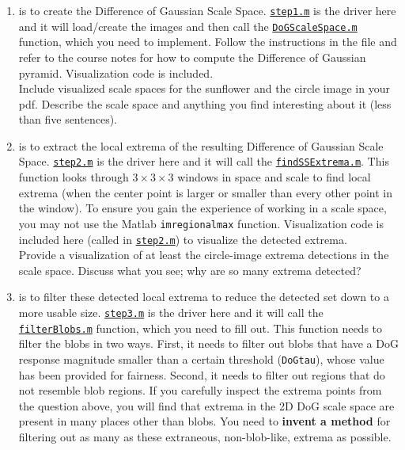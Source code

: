 \begin{enumerate}[Step 1]
\item is to create the Difference of Gaussian Scale Space.
		\href{./hw3/problem1/step1.m}{\texttt{step1.m}} is the driver here and it will load/create the images and then call the \href{./hw3/problem1/DoGScaleSpace.m}{\texttt{DoGScaleSpace.m}} function, which you need to implement.
		Follow the instructions in the file and refer to the course notes for how to compute the Difference of Gaussian pyramid.
		Visualization code is included.\\
		Include visualized scale spaces for the sunflower and the circle image in your pdf.
		Describe the scale space and anything you find interesting about it (less than five sentences).
\item is to extract the local extrema of the resulting Difference of Gaussian Scale Space.
		\href{./hw3/problem1/step2.m}{\texttt{step2.m}} is the driver here and it will call the \href{./hw3/problem1/findSSExtrema.m}{\texttt{findSSExtrema.m}}.
		This function looks through \(3 \times 3 \times 3\) windows in space and scale to find local extrema (when the center point is larger or smaller than every other point in the window).
		To ensure you gain the experience of working in a scale space, you may not use the Matlab \texttt{imregionalmax} function.
		Visualization code is included here (called in \href{./hw3/problem1/step2.m}{\texttt{step2.m}}) to visualize the detected extrema.\\
		Provide a visualization of at least the circle-image extrema detections in the scale space.
		Discuss what you see; why are so many extrema detected?
\item is to filter these detected local extrema to reduce the detected set down to a more usable size.
		\href{./hw3/problem1/step3.m}{\texttt{step3.m}} is the driver here and it will call the \href{./hw3/problem1/filterBlobs.m}{\texttt{filterBlobs.m}} function, which you need to fill out.
		This function needs to filter the blobs in two ways.
		First, it needs to filter out blobs that have a DoG response magnitude smaller than a certain threshold (\texttt{DoGtau}), whose value has been provided for fairness.
		Second, it needs to filter out regions that do not resemble blob regions.
		If you carefully inspect the extrema points from the question above, you will find that extrema in the 2D DoG scale space are present in many places other than blobs.
		You need to \textbf{invent a method} for filtering out as many as these extraneous, non-blob-like, extrema as possible.

\end{enumerate}
